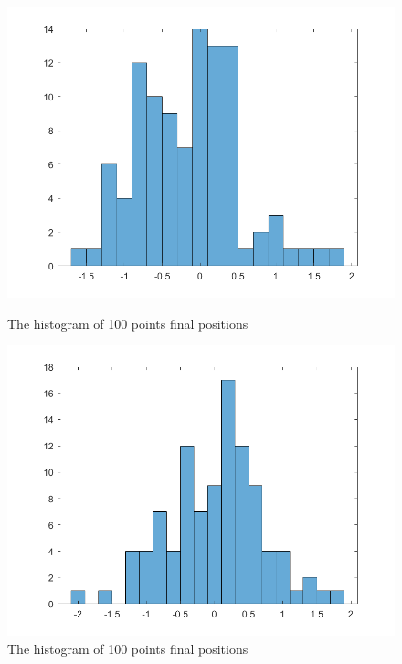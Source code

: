 \documentclass{article}
\begin{document}
\begin{figure}[htbp]
    \centering
    \begin{minipage}{0.45\linewidth}
        \centering
        \includegraphics[width=\linewidth]{walk100.png}
        \caption{The histogram of 100 points final positions}
    \end{minipage}
    \hfill
    \begin{minipage}{0.45\linewidth}
        \centering
        \includegraphics[width=\linewidth]{walk1001.png}
        \caption{The histogram of 100 points final positions}
    \end{minipage}
\end{figure}
\end{document}

